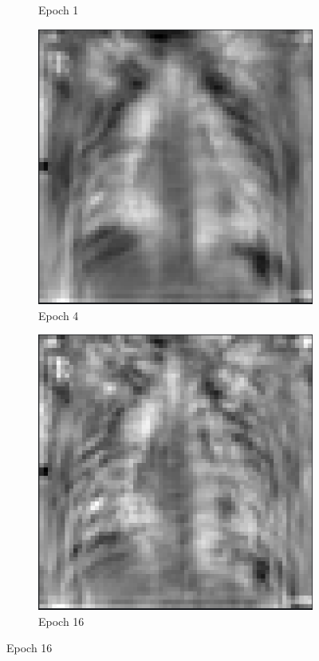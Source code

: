 \documentclass{article}
\begin{document}
\begin{figure}[!ht]
\begin{subfigure}{0.22\textwidth}
  \caption*{Epoch 1}\label{fig:training-1-epoch-1}
\end{subfigure}
\xspace
\begin{subfigure}{0.22\textwidth}%
  \includegraphics[width=\linewidth]{assets/perceptron/training-1-epoch-4.png}
  \caption*{Epoch 4}\label{fig:train-1-epoch-4}
\end{subfigure}
\xspace
\begin{subfigure}{0.22\textwidth}%
  \includegraphics[width=\linewidth]{assets/perceptron/training-1-epoch-16.png}
  \caption*{Epoch 16}\label{fig:train-1-epoch-16}
\end{subfigure}
\end{figure}
\end{document}
